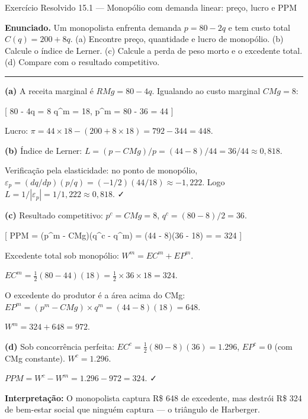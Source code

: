 \documentclass[11pt,twoside,openright]{book}
\begin{document}
\begin{exresolvidobox}{Exercício Resolvido 15.1 — Monopólio com demanda linear: preço, lucro e PPM}

\textbf{Enunciado.} Um monopolista enfrenta demanda \(p = 80 - 2q\) e
tem custo total \(C(q) = 200 + 8q\). (a) Encontre preço, quantidade e
lucro de monopólio. (b) Calcule o índice de Lerner. (c) Calcule a perda
de peso morto e o excedente total. (d) Compare com o resultado
competitivo.

\begin{center}\rule{0.5\linewidth}{0.5pt}\end{center}

\textbf{(a)} A receita marginal é \(RMg = 80 - 4q\). Igualando ao custo
marginal \(CMg = 8\):

{[} 80 - 4q = 8 \implies q\^{}m = 18, \quad p\^{}m = 80 - 36 = 44 {]}

Lucro: \(\pi = 44 \times 18 - (200 + 8 \times 18) = 792 - 344 = 448\).

\textbf{(b)} Índice de Lerner:
\(L = (p - CMg)/p = (44 - 8)/44 = 36/44 \approx 0{,}818\).

Verificação pela elasticidade: no ponto de monopólio,
\(\varepsilon_p = (dq/dp)(p/q) = (-1/2)(44/18) \approx -1{,}222\). Logo
\(L = 1/|\varepsilon_p| = 1/1{,}222 \approx 0{,}818\). ✓

\textbf{(c)} Resultado competitivo: \(p^c = CMg = 8\),
\(q^c = (80-8)/2 = 36\).

{[} PPM = (p\^{}m - CMg)(q\^{}c - q\^{}m) = (44 -
8)(36 - 18) =    = 324 {]}

Excedente total sob monopólio: \(W^m = EC^m + EP^m\).

\(EC^m = \frac{1}{2}(80 - 44)(18) = \frac{1}{2} \times 36 \times 18 = 324\).

O excedente do produtor é a área acima do CMg:
\(EP^m = (p^m - CMg) \times q^m = (44 - 8)(18) = 648\).

\(W^m = 324 + 648 = 972\).

\textbf{(d)} Sob concorrência perfeita:
\(EC^c = \frac{1}{2}(80-8)(36) = 1.296\), \(EP^c = 0\) (com CMg
constante). \(W^c = 1.296\).

\(PPM = W^c - W^m = 1.296 - 972 = 324\). ✓

\textbf{Interpretação:} O monopolista captura R\$ 648 de excedente, mas
destrói R\$ 324 de bem-estar social que ninguém captura --- o triângulo
de Harberger.

\end{exresolvidobox}
\end{document}

